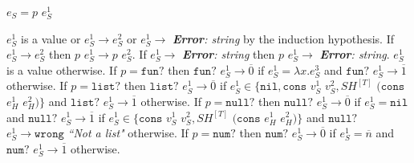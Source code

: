 \begin{case}

$e_{S}=p$ $e_{S}^{1}$

$e_{S}^{1}$ is a value or $e_{S}^{1}\rightarrow e_{S}^{2}$ or $e_{S}^{1}\rightarrow$ \emph{\textbf{Error}: string} by the induction hypothesis.  If $e_{S}^{1}\rightarrow e_{S}^{2}$ then $p$ $e_{S}^{1}\rightarrow p$ $e_{S}^{2}$.  If $e_{S}^{1}\rightarrow$ \emph{\textbf{Error}: string} then $p$ $e_{S}^{1}\rightarrow$ \emph{\textbf{Error}: string}.  $e_{S}^{1}$ is a value otherwise.  If $p=\mathtt{fun?}$ then $\mathtt{fun?}$ $e_{S}^{1}\rightarrow\overline{0}$ if $e_{S}^{1}=\lambda x.e_{S}^{3}$ and $\mathtt{fun?}$ $e_{S}^{1}\rightarrow\overline{1}$ otherwise.  If $p=\mathtt{list?}$ then $\mathtt{list?}$ $e_{S}^{1}\rightarrow\overline{0}$ if $e_{S}^{1}\in\lbrace\mathtt{nil},\mathtt{cons}$ $v_{S}^{1}$ $v_{S}^{2},SH^{[T]}$ $(\mathtt{cons}$ $e_{H}^{1}$ $e_{H}^{2})\rbrace$ and $\mathtt{list?}$ $e_{S}^{1}\rightarrow\overline{1}$ otherwise.  If $p=\mathtt{null?}$ then $\mathtt{null?}$ $e_{S}^{1}\rightarrow\overline{0}$ if $e_{S}^{1}=\mathtt{nil}$ and $\mathtt{null?}$ $e_{S}^{1}\rightarrow\overline{1}$ if $e_{S}^{1}\in\lbrace\mathtt{cons}$ $v_{S}^{1}$ $v_{S}^{2},SH^{[T]}$ $(\mathtt{cons}$ $e_{H}^{1}$ $e_{H}^{2})\rbrace$ and $\mathtt{null?}$ $e_{S}^{1}\rightarrow\mathtt{wrong}$ \emph{``Not a list"} otherwise.  If $p=\mathtt{num?}$ then $\mathtt{num?}$ $e_{S}^{1}\rightarrow\overline{0}$ if $e_{S}^{1}=\overline{n}$ and $\mathtt{num?}$ $e_{S}^{1}\rightarrow\overline{1}$ otherwise.

\end{case}